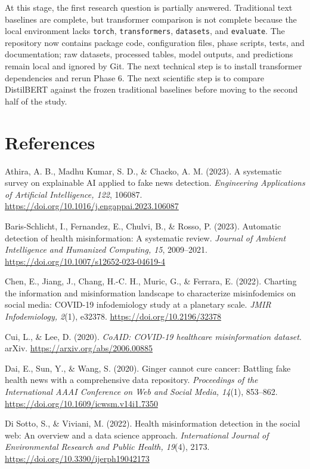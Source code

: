 \documentclass[12pt]{article}
\newcommand{\aparef}[1]{\noindent\hangindent=0.5in\hangafter=1 #1\par}
\begin{document}
At this stage, the first research question is partially answered. Traditional text baselines are complete, but transformer comparison is not complete because the local environment lacks \texttt{torch}, \texttt{transformers}, \texttt{datasets}, and \texttt{evaluate}. The repository now contains package code, configuration files, phase scripts, tests, and documentation; raw datasets, processed tables, model outputs, and predictions remain local and ignored by Git. The next technical step is to install transformer dependencies and rerun Phase 6. The next scientific step is to compare DistilBERT against the frozen traditional baselines before moving to the second half of the study.

\newpage
\section*{References}

\aparef{Athira, A. B., Madhu Kumar, S. D., \& Chacko, A. M. (2023). A systematic survey on explainable AI applied to fake news detection. \textit{Engineering Applications of Artificial Intelligence, 122}, 106087. \url{https://doi.org/10.1016/j.engappai.2023.106087}}

\aparef{Baris-Schlicht, I., Fernandez, E., Chulvi, B., \& Rosso, P. (2023). Automatic detection of health misinformation: A systematic review. \textit{Journal of Ambient Intelligence and Humanized Computing, 15}, 2009--2021. \url{https://doi.org/10.1007/s12652-023-04619-4}}

\aparef{Chen, E., Jiang, J., Chang, H.-C. H., Muric, G., \& Ferrara, E. (2022). Charting the information and misinformation landscape to characterize misinfodemics on social media: COVID-19 infodemiology study at a planetary scale. \textit{JMIR Infodemiology, 2}(1), e32378. \url{https://doi.org/10.2196/32378}}

\aparef{Cui, L., \& Lee, D. (2020). \textit{CoAID: COVID-19 healthcare misinformation dataset}. arXiv. \url{https://arxiv.org/abs/2006.00885}}

\aparef{Dai, E., Sun, Y., \& Wang, S. (2020). Ginger cannot cure cancer: Battling fake health news with a comprehensive data repository. \textit{Proceedings of the International AAAI Conference on Web and Social Media, 14}(1), 853--862. \url{https://doi.org/10.1609/icwsm.v14i1.7350}}

\aparef{Di Sotto, S., \& Viviani, M. (2022). Health misinformation detection in the social web: An overview and a data science approach. \textit{International Journal of Environmental Research and Public Health, 19}(4), 2173. \url{https://doi.org/10.3390/ijerph19042173}}
\end{document}

